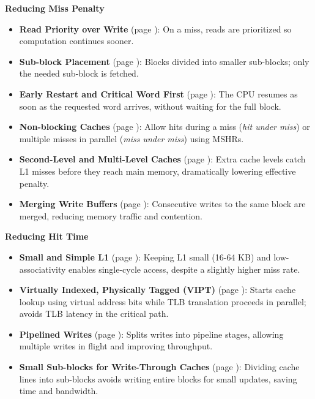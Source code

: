 \begin{flushleft}
    \textcolor{Green3}{ \textbf{Reducing Miss Penalty}}
\end{flushleft}
\begin{itemize}
    \item \textbf{Read Priority over Write} (page \pageref{paragraph: Read Priority over Write on Miss}): On a miss, reads are prioritized so computation continues sooner.
    \item \textbf{Sub-block Placement} (page \pageref{paragraph: Sub-block Placement}): Blocks divided into smaller sub-blocks; only the needed sub-block is fetched.
    \item \textbf{Early Restart and Critical Word First} (page \pageref{paragraph: Early Restart and Critical Word First}): The CPU resumes as soon as the requested word arrives, without waiting for the full block.
    \item \textbf{Non-blocking Caches} (page \pageref{paragraph: Non-Blocking Caches}): Allow hits during a miss (\emph{hit under miss}) or multiple misses in parallel (\emph{miss under miss}) using MSHRs.
    \item \textbf{Second-Level and Multi-Level Caches} (page \pageref{paragraph: Second-Level and Multi-Level Caches}): Extra cache levels catch L1 misses before they reach main memory, dramatically lowering effective penalty.
    \item \textbf{Merging Write Buffers} (page \pageref{paragraph: Merging Write Buffers}): Consecutive writes to the same block are merged, reducing memory traffic and contention.
\end{itemize}

\begin{flushleft}
    \textcolor{Green3}{ \textbf{Reducing Hit Time}}
\end{flushleft}
\begin{itemize}
    \item \textbf{Small and Simple L1} (page \pageref{paragraph: Small and Simple L1 Caches}): Keeping L1 small (16-64 KB) and low-associativity enables single-cycle access, despite a slightly higher miss rate.
    \item \textbf{Virtually Indexed, Physically Tagged (VIPT)} (page \pageref{paragraph: Avoid address translation - VIPT}): Starts cache lookup using virtual address bits while TLB translation proceeds in parallel; avoids TLB latency in the critical path.
    \item \textbf{Pipelined Writes} (page \pageref{paragraph: Pipelined Writes}): Splits writes into pipeline stages, allowing multiple writes in flight and improving throughput.
    \item \textbf{Small Sub-blocks for Write-Through Caches} (page \pageref{paragraph: Small Sub-Blocks for Write-Through Caches}): Dividing cache lines into sub-blocks avoids writing entire blocks for small updates, saving time and bandwidth.
\end{itemize}

